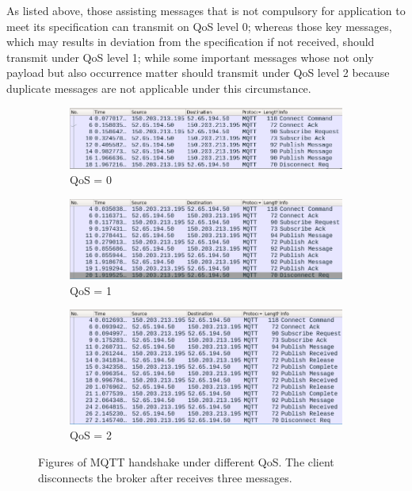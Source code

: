 \documentclass[12pt, letterpaper]{article}
\begin{document}
As listed above, those assisting messages that is not compulsory for application to meet its specification can transmit on QoS level 0; whereas those key messages, which may results in deviation from the specification if not received, should transmit under QoS level 1; while some important messages whose not only payload but also occurrence matter should transmit under QoS level 2 because duplicate messages are not applicable under this circumstance.

\begin{figure}
	\centering
	\begin{subfigure}[t]{0.77\textwidth}
		\centering
		\includegraphics[width=\textwidth]{handshake-q0}
		\caption{QoS = 0}
	\end{subfigure}
	
	\begin{subfigure}[t]{0.77\textwidth}
		\centering
		\includegraphics[width=\textwidth]{handshake-q1}
		\caption{QoS = 1}
	\end{subfigure}
	
	\begin{subfigure}[t]{0.77\textwidth}
		\centering
		\includegraphics[width=\textwidth]{handshake-q2}
		\caption{QoS = 2}
	\end{subfigure}

	\caption{Figures of MQTT handshake under different QoS. The client disconnects the broker after receives three messages.}
	\label{fig:handshake_snap_shot}
\end{figure}
\end{document}
